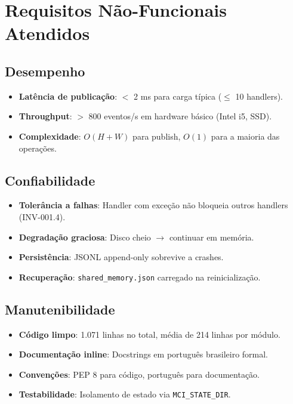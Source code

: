 \section{Requisitos Não-Funcionais Atendidos}
\label{sec:non-functional}

\subsection{Desempenho}

\begin{itemize}
    \item \textbf{Latência de publicação}: $<$ 2 ms para carga típica ($\leq$ 10 handlers).
    \item \textbf{Throughput}: $>$ 800 eventos/s em hardware básico (Intel i5, SSD).
    \item \textbf{Complexidade}: $O(H+W)$ para publish, $O(1)$ para a maioria das operações.
\end{itemize}

\subsection{Confiabilidade}

\begin{itemize}
    \item \textbf{Tolerância a falhas}: Handler com exceção não bloqueia outros handlers (INV-001.4).
    \item \textbf{Degradação graciosa}: Disco cheio $\rightarrow$ continuar em memória.
    \item \textbf{Persistência}: JSONL append-only sobrevive a crashes.
    \item \textbf{Recuperação}: \texttt{shared\_memory.json} carregado na reinicialização.
\end{itemize}

\subsection{Manutenibilidade}

\begin{itemize}
    \item \textbf{Código limpo}: 1.071 linhas no total, média de 214 linhas por módulo.
    \item \textbf{Documentação inline}: Docstrings em português brasileiro formal.
    \item \textbf{Convenções}: PEP 8 para código, português para documentação.
    \item \textbf{Testabilidade}: Isolamento de estado via \texttt{MCI\_STATE\_DIR}.
\end{itemize}

